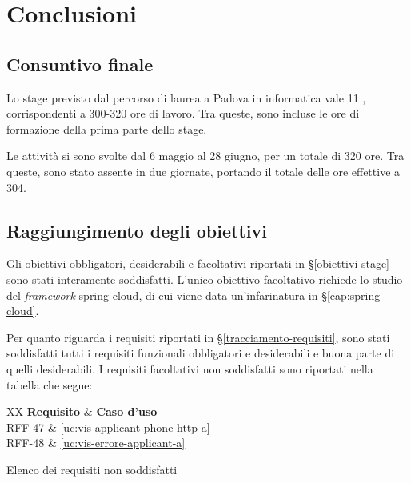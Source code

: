 
\chapter{Conclusioni}\label{cap:conclusioni}


\section{Consuntivo finale}

Lo stage previsto dal percorso di laurea a Padova in informatica vale 11 , corrispondenti a 300-320 ore di lavoro. Tra queste, sono incluse le ore di formazione della prima parte dello stage.

Le attività si sono svolte dal 6 maggio al 28 giugno, per un totale di 320 ore. Tra queste, sono stato assente in due giornate, portando il totale delle ore effettive a 304.

\section{Raggiungimento degli obiettivi}
Gli obiettivi obbligatori, desiderabili e facoltativi riportati in \S\ref{obiettivi-stage} sono stati interamente soddisfatti. L'unico obiettivo facoltativo richiede lo studio del \textit{framework} \gls{spring-cloud}, di cui viene data un'infarinatura in \S\ref{cap:spring-cloud}.

Per quanto riguarda i requisiti riportati in \S\ref{tracciamento-requisiti}, sono stati soddisfatti tutti i requisiti funzionali obbligatori e desiderabili e buona parte di quelli desiderabili. 
I requisiti facoltativi non soddisfatti sono riportati nella tabella che segue:

\begin{table}[H]
	\centering
	\begin{paddedtablex}[1.4]{0.5\textwidth}{XX}
		\textbf{Requisito} & \textbf{Caso d'uso}\\
		\toprule
		RFF-47 & \ref{uc:vis-applicant-phone-http-a}\\
		RFF-48 & \ref{uc:vis-errore-applicant-a}\\
		\bottomrule
	\end{paddedtablex}
	\vspace{4pt}
	\caption{Elenco dei requisiti non soddisfatti}
\end{table}

